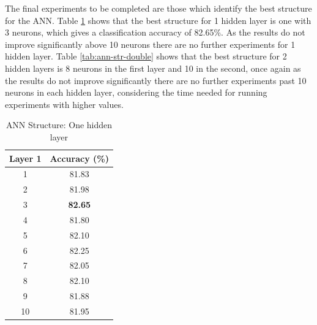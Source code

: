 \documentclass[12pt]{article}
\begin{document}
      The final experiments to be completed are those which identify the best structure for the ANN. Table \ref{tab:ann-str-single} shows that the best structure for 1 hidden layer is one with 3 neurons, which gives a classification accuracy of 82.65\%. As the results do not improve significantly above 10 neurons there are no further experiments for 1 hidden layer. Table \ref{tab:ann-str-double} shows that the best structure for 2 hidden layers is 8 neurons in the first layer and 10 in the second, once again as the results do not improve significantly there are no further experiments past 10 neurons in each hidden layer, considering the time needed for running experiments with higher values.

      \begin{table}[H]
        \centering
        \caption{ANN Structure: One hidden layer}
        \begin{tabular}{c|c}
          \toprule
          Layer 1 & Accuracy (\%) \\
          \midrule
          1     & 81.83 \\
          2     & 81.98 \\
          3     & \textbf{82.65} \\
          4     & 81.80 \\
          5     & 82.10 \\
          6     & 82.25 \\
          7     & 82.05 \\
          8     & 82.10 \\
          9     & 81.88 \\
          10    & 81.95 \\
          \bottomrule
        \end{tabular}
        \label{tab:ann-str-single}
      \end{table}
\end{document}
